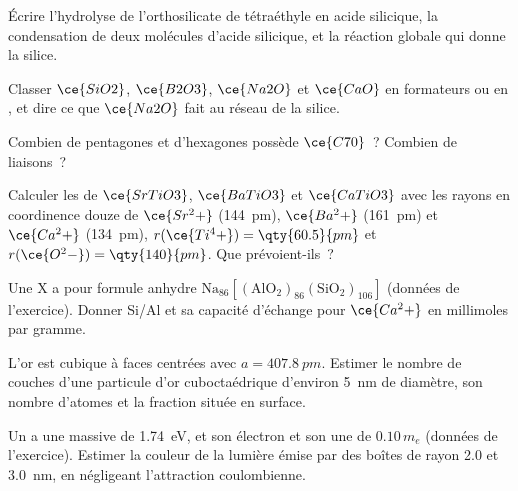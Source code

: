 \begin{exercise}[$\star$]\label{exo:b3:inorganic-materials:2}
Écrire l'hydrolyse de l'orthosilicate de tétraéthyle en acide silicique, la
condensation de deux molécules d'acide silicique, et la réaction globale qui
donne la silice.
\end{exercise}

\begin{exercise}[$\star$]\label{exo:b3:inorganic-materials:3}
Classer $\ce{SiO2}$, $\ce{B2O3}$, $\ce{Na2O}$ et $\ce{CaO}$ en formateurs ou en , et dire ce que
$\ce{Na2O}$ fait au réseau de la silice.
\end{exercise}

\begin{exercise}[$\star$]\label{exo:b3:inorganic-materials:4}
Combien de pentagones et d'hexagones possède $\ce{C70}$~? Combien de liaisons~?
\end{exercise}

\begin{exercise}[$\star\star$]\label{exo:b3:inorganic-materials:5}
Calculer les  de $\ce{SrTiO3}$, $\ce{BaTiO3}$ et $\ce{CaTiO3}$ avec les rayons en coordinence douze
de $\ce{Sr^2+}$ (\qty{144}{pm}), $\ce{Ba^2+}$ (\qty{161}{pm}) et $\ce{Ca^2+}$ (\qty{134}{pm}), $r(\ce{Ti^4+}) = \qty{60.5}{pm}$ et $r(\ce{O^2-}) = \qty{140}{pm}$. Que
prévoient-ils~?
\end{exercise}

\begin{exercise}[$\star\star$]\label{exo:b3:inorganic-materials:6}
Une  X a pour formule anhydre $\mathrm{Na_{86}[(AlO_2)_{86}(SiO_2)_{106}]}$ (données de l'exercice).
Donner Si/Al et sa capacité d'échange pour $\ce{Ca^2+}$ en millimoles par gramme.
\end{exercise}

\begin{exercise}[$\star\star$]\label{exo:b3:inorganic-materials:7}
L'or est cubique à faces centrées avec $a = \qty{407.8}{pm}$. Estimer le nombre de couches d'une
particule d'or cuboctaédrique d'environ \qty{5}{nm} de diamètre, son nombre
d'atomes et la fraction située en surface.
\end{exercise}

\begin{exercise}[$\star\star$]\label{exo:b3:inorganic-materials:8}
Un  a une  massive de \qty{1.74}{eV}, et son électron et son  une  de $0.10\,m_e$ (données de l'exercice). Estimer la couleur de la lumière émise par
des boîtes de rayon 2.0 et \qty{3.0}{nm}, en négligeant l'attraction coulombienne.
\end{exercise}

